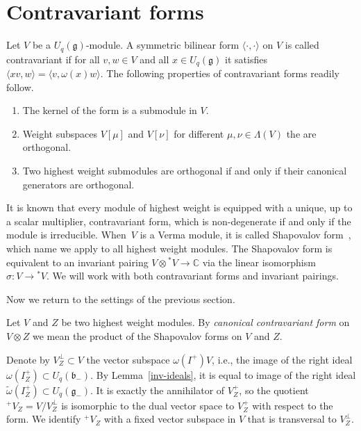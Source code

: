 \section{Contravariant forms}
Let $V$ be a $U_q(\mathfrak{g})$-module. A symmetric bilinear form $\langle \cdot,\cdot\rangle$ on $V$ is called contravariant if for all $v,w\in V$ and all $x\in U_q(\mathfrak{g})$ it satisfies $\langle x v, w\rangle=\langle v,\omega(x)w\rangle$. The following properties of contravariant forms readily follow.
\begin{Proposition}\label{form_features} \quad
\begin{enumerate}\itemsep=0pt
 \item[$i)$] The kernel of the form is a submodule in $V$.
 \item[$ii)$] Weight subspaces $V[\mu]$ and $V[\nu]$ for different $\mu,\nu\in \Lambda(V)$ the are orthogonal.
 \item[$iii)$] Two highest weight submodules are orthogonal if and only if their canonical generators are orthogonal.
 \end{enumerate}
\end{Proposition}

 It is known that every module of highest weight is equipped with a unique, up to a scalar multiplier, contravariant form, which is non-degenerate if and only if the module is irreducible. When~$V$ is a Verma module, it is called Shapovalov form~\cite{Sh}, which name we apply to all highest weight modules. The Shapovalov form is equivalent to an invariant pairing $V\otimes {}^*\!V\to \mathbb{C}$ via the linear isomorphism $\sigma \colon V\to {}^*\!V$. We will work with both contravariant forms and invariant pairings.

Now we return to the settings of the previous section.
\begin{Definition} Let $V$ and $Z$ be two highest weight modules. By {\em canonical contravariant form} on $V\otimes Z$ we mean the product of the Shapovalov forms on $V$ and $Z$.
\end{Definition}

 Denote by $V^\perp_Z\subset V$ the vector subspace $\omega(I^+)V$, i.e., the image of the right ideal $\omega(I^+_Z)\subset U_q(\mathfrak{b}_-)$. By Lemma~\ref{inv-ideals}, it is equal to image of the right ideal $\tilde \omega (I^+_Z)\subset U_q(\mathfrak{g}_-)$. It is exactly the annihilator of $V^+_Z$, so the quotient ${}^+\!V_Z=V/V^\perp_Z$ is isomorphic to the dual vector space to $V^+_Z$ with respect to the form. We identify ${}^+\!V_Z$ with a fixed vector subspace in $V$ that is transversal to $V^\perp_Z$.

